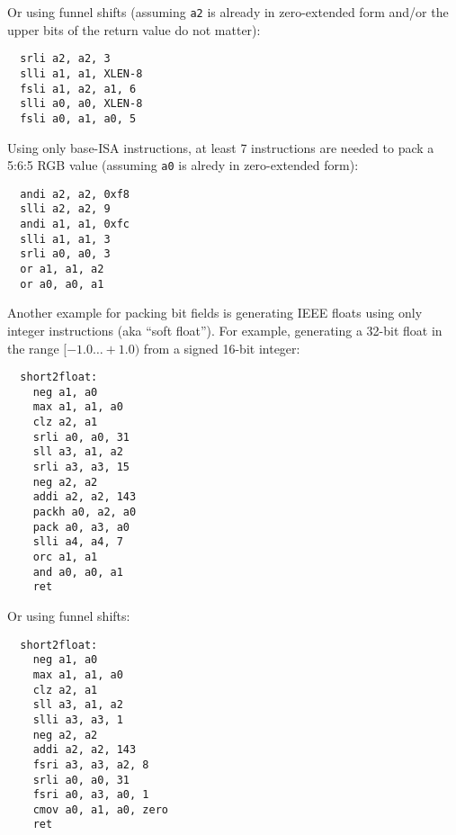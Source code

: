 Or using funnel shifts (assuming {\tt a2} is already in zero-extended form
and/or the upper bits of the return value do not matter):

\begin{minipage}{\linewidth}
\begin{verbatim}
  srli a2, a2, 3
  slli a1, a1, XLEN-8
  fsli a1, a2, a1, 6
  slli a0, a0, XLEN-8
  fsli a0, a1, a0, 5
\end{verbatim}
\end{minipage}

Using only base-ISA instructions, at least 7 instructions are needed to pack a
5:6:5 RGB value (assuming {\tt a0} is alredy in zero-extended form):

\begin{minipage}{\linewidth}
\begin{verbatim}
  andi a2, a2, 0xf8
  slli a2, a2, 9
  andi a1, a1, 0xfc
  slli a1, a1, 3
  srli a0, a0, 3
  or a1, a1, a2
  or a0, a0, a1
\end{verbatim}
\end{minipage}

Another example for packing bit fields is generating IEEE floats using
only integer instructions (aka ``soft float''). For example, generating
a 32-bit float in the range $[-1.0 \dots +1.0)$ from a signed 16-bit
integer:

\begin{minipage}{\linewidth}
\begin{verbatim}
  short2float:
    neg a1, a0
    max a1, a1, a0
    clz a2, a1
    srli a0, a0, 31
    sll a3, a1, a2
    srli a3, a3, 15
    neg a2, a2
    addi a2, a2, 143
    packh a0, a2, a0
    pack a0, a3, a0
    slli a4, a4, 7
    orc a1, a1
    and a0, a0, a1
    ret
\end{verbatim}
\end{minipage}

Or using funnel shifts:

\begin{minipage}{\linewidth}
\begin{verbatim}
  short2float:
    neg a1, a0
    max a1, a1, a0
    clz a2, a1
    sll a3, a1, a2
    slli a3, a3, 1
    neg a2, a2
    addi a2, a2, 143
    fsri a3, a3, a2, 8
    srli a0, a0, 31
    fsri a0, a3, a0, 1
    cmov a0, a1, a0, zero
    ret
\end{verbatim}
\end{minipage}


